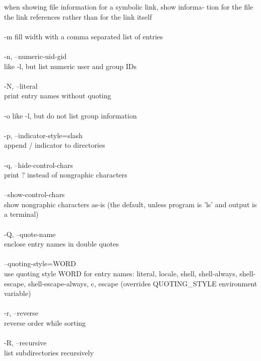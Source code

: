 \documentclass{article}
\begin{document}
              when showing file information for a symbolic link, show informa‐
              tion  for  the file the link references rather than for the link
              itself \\
\\
       -m     fill width with a comma separated list of entries \\
\\
       -n, --numeric-uid-gid \\
              like -l, but list numeric user and group IDs \\
\\
       -N, --literal \\
              print entry names without quoting \\
\\
       -o     like -l, but do not list group information \\
\\
       -p, --indicator-style=slash \\
              append / indicator to directories \\
\\
       -q, --hide-control-chars \\
              print ? instead of nongraphic characters \\
\\
       --show-control-chars \\
              show nongraphic characters as-is (the default, unless program is
              'ls' and output is a terminal) \\
\\
       -Q, --quote-name \\
              enclose entry names in double quotes \\
\\
       --quoting-style=WORD \\
              use  quoting style WORD for entry names: literal, locale, shell,
              shell-always,  shell-escape,  shell-escape-always,   c,   escape
              (overrides QUOTING_STYLE environment variable) \\
\\
       -r, --reverse \\
              reverse order while sorting \\
\\
       -R, --recursive \\
              list subdirectories recursively \\
\end{document}
